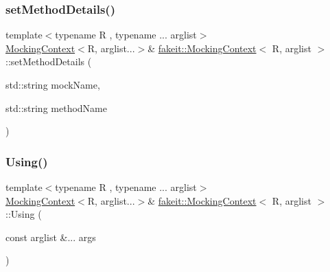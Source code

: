 \subsubsection{\texorpdfstring{setMethodDetails()}{setMethodDetails()}\hspace{0.1cm}{\footnotesize\ttfamily [9/9]}}
{\footnotesize\ttfamily template$<$typename R , typename ... arglist$>$ \\
\mbox{\hyperlink{classfakeit_1_1MockingContext}{Mocking\+Context}}$<$R, arglist...$>$\& \mbox{\hyperlink{classfakeit_1_1MockingContext}{fakeit\+::\+Mocking\+Context}}$<$ R, arglist $>$\+::set\+Method\+Details (\begin{DoxyParamCaption}\item[{std\+::string}]{mock\+Name,  }\item[{std\+::string}]{method\+Name }\end{DoxyParamCaption})\hspace{0.3cm}{\ttfamily [inline]}}

\mbox{\label{classfakeit_1_1MockingContext_ade706bb68e9ffb128fad353a3b15758b}} 
\subsubsection{\texorpdfstring{Using()}{Using()}\hspace{0.1cm}{\footnotesize\ttfamily [1/18]}}
{\footnotesize\ttfamily template$<$typename R , typename ... arglist$>$ \\
\mbox{\hyperlink{classfakeit_1_1MockingContext}{Mocking\+Context}}$<$R, arglist...$>$\& \mbox{\hyperlink{classfakeit_1_1MockingContext}{fakeit\+::\+Mocking\+Context}}$<$ R, arglist $>$\+::Using (\begin{DoxyParamCaption}\item[{const arglist \&...}]{args }\end{DoxyParamCaption})\hspace{0.3cm}{\ttfamily [inline]}}

\mbox{\label{classfakeit_1_1MockingContext_acb9bd9b011ac2ad88c8d08eebfa101ac}} 
